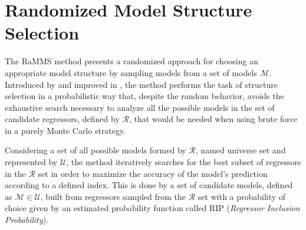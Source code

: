 
\section{Randomized Model Structure Selection}%
\label{sec:ramss}


The RaMMS method presents a randomized approach for choosing an appropriate model structure by sampling models from a set of models $\mathscr{M}$.
Introduced by \cite{falsone2014} and improved in \cite{falsone2015}, the method performs the task of  structure selection in a probabilistic way that, despite the random behavior, avoids the exhaustive search necessary to analyze all the possible models in the set of candidate regressors, defined by $\mathscr{R}$,
that would be needed when using brute force in a purely Monte Carlo strategy.

Considering a set of all possible models formed by $\mathscr{R}$, named universe set and represented by $\mathscr{U}$, the method iteratively searches for the best subset of regressors in the $\mathscr{R}$ set in order to maximize the accuracy of the model's prediction according to a defined index. This is done by a set of candidate models, defined as $\mathscr{M} \in \mathscr{U}$, built from regressors sampled from the $\mathscr{R}$ set with a probability of choice given by an estimated probability function called RIP (\textit{Regressor Inclusion Probability}).

